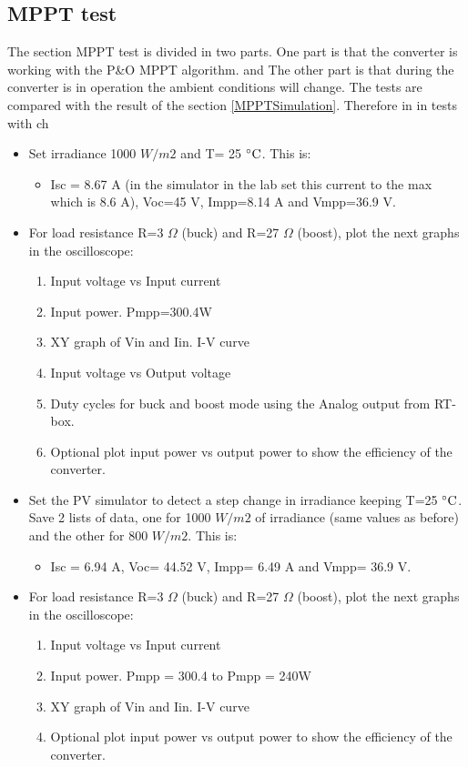 \subsection{MPPT test}
The section MPPT test is divided in two parts. One part is that the converter is working with the P\&O MPPT algorithm. and The other part is that during the converter is in operation the ambient conditions will change. The tests are compared with the result of the section \ref{MPPTSimulation}.  Therefore  in in tests with ch
\begin{itemize}	
	\item Set irradiance 1000 $W /m2$ and T= 25 $\decC$. This is: 
		\begin{itemize}
		\item Isc = 8.67 A (in the simulator in the lab set this current to the max which is 8.6 A), Voc=45 V, Impp=8.14 A and Vmpp=36.9 V.
		\end{itemize} 
	\item For load resistance R=3 $\Omega$ (buck) and R=27 $\Omega$ (boost), plot the next graphs in the oscilloscope:
		\begin{enumerate}
		\item Input voltage vs Input current 
		\item Input power. Pmpp=300.4W
		\item XY graph of Vin and Iin. I-V curve
		\item Input voltage vs Output voltage
		\item Duty cycles for buck and boost mode using the Analog output from RT-box. 
		\item Optional plot input power vs output power to show the efficiency of the converter.
		\end{enumerate}
	
	\item Set the PV simulator to detect a step change in irradiance keeping T=25 $\decC$. Save 2 lists of data, one for 1000 $W /m2$ of irradiance (same values as before) and the other for 800 $W /m2$. This is:
		\begin{itemize}
		\item Isc = 6.94 A, Voc= 44.52 V, Impp= 6.49 A and Vmpp= 36.9 V.
      	\end{itemize} 
      \item For load resistance R=3 $\Omega$ (buck) and R=27 $\Omega$ (boost), plot the next graphs in the oscilloscope:
      \begin{enumerate}
      	\item Input voltage vs Input current 
      	\item Input power. Pmpp = 300.4 to Pmpp = 240W
      	\item XY graph of Vin and Iin. I-V curve
      	\item Optional plot input power vs output power to show the efficiency of the converter.
      \end{enumerate}
  

\end{itemize}
